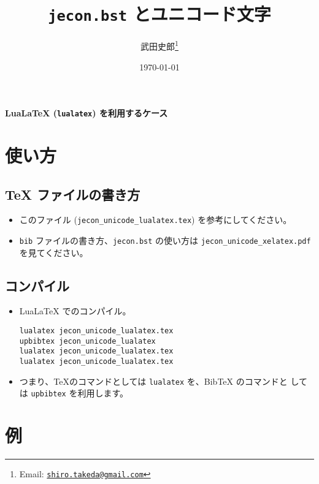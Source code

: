 \documentclass{ltjsarticle}
\title{\textbf{\texttt{jecon.bst} とユニコード文字}}
\author{武田史郎\thanks{Email: \texttt{\href{mailto:shiro.takeda@gmail.com}{shiro.takeda@gmail.com}}}}
\date{\today}
\begin{document}
\begin{flushleft}
 {\Large \textbf{LuaLaTeX (\texttt{lualatex}) を利用するケース}}
\end{flushleft}

\vspace{1em}

\section{使い方}

\subsection{TeX ファイルの書き方}

\begin{itemize}
 \item このファイル (\texttt{jecon\_unicode\_lualatex.tex}) を参考にしてください。
 \item \texttt{bib} ファイルの書き方、\texttt{jecon.bst} の使い方は
       \texttt{jecon\_unicode\_xelatex.pdf} を見てください。
\end{itemize}

\subsection{コンパイル}

\begin{itemize}
 \item LuaLaTeX でのコンパイル。
\begin{verbatim}
lualatex jecon_unicode_lualatex.tex
upbibtex jecon_unicode_lualatex
lualatex jecon_unicode_lualatex.tex               
lualatex jecon_unicode_lualatex.tex
\end{verbatim}
 \item つまり、\TeX のコマンドとしては \texttt{lualatex} を、BibTeX のコマンドと
       しては \texttt{upbibtex} を利用します。
\end{itemize}

\section{例}



\nocite{*}



%

\end{document}
